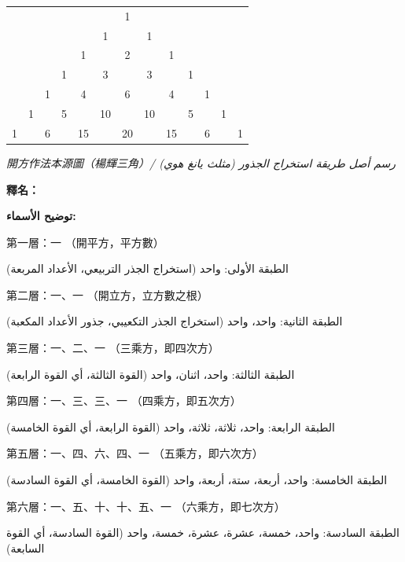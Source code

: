 \documentclass[11pt,a4paper]{article}
\newcommand{\ar}[1]{\arabicfont\beginR #1\endR}
\newcommand{\bilingualrow}[2]{%
\noindent\begin{minipage}[t]{0.48\textwidth}#1\end{minipage}\hfill\begin{minipage}[t]{0.48\textwidth}\arabicfont\beginR #2\endR\end{minipage}\par\vspace{0.5cm}}
\begin{document}
\vspace{1.5em}

\begin{center}
{\color{chartcolor}
\begin{tabular}{*{13}{c}}
& & & & & & 1 & & & & & & \\[0.8em]
& & & & & 1 & & 1 & & & & & \\[0.8em]
& & & & 1 & & 2 & & 1 & & & & \\[0.8em]
& & & 1 & & 3 & & 3 & & 1 & & & \\[0.8em]
& & 1 & & 4 & & 6 & & 4 & & 1 & & \\[0.8em]
& 1 & & 5 & & 10 & & 10 & & 5 & & 1 & \\[0.8em]
1 & & 6 & & 15 & & 20 & & 15 & & 6 & & 1 \\
\end{tabular}
}
\end{center}

\vspace{0.5em}

\begin{center}
\textit{開方作法本源圖（楊輝三角）/ \ar{رسم أصل طريقة استخراج الجذور (مثلث يانغ هوي)}}
\end{center}

\vspace{1.5em}

\bilingualrow{
\textbf{釋名：}
}{
\textbf{توضيح الأسماء:}
}

\vspace{0.3em}

\bilingualrow{
第一層：一 \quad（開平方，平方數）
}{
الطبقة الأولى: واحد \quad (استخراج الجذر التربيعي، الأعداد المربعة)
}

\bilingualrow{
第二層：一、一 \quad（開立方，立方數之根）
}{
الطبقة الثانية: واحد، واحد \quad (استخراج الجذر التكعيبي، جذور الأعداد المكعبة)
}

\bilingualrow{
第三層：一、二、一 \quad（三乘方，即四次方）
}{
الطبقة الثالثة: واحد، اثنان، واحد \quad (القوة الثالثة، أي القوة الرابعة)
}

\bilingualrow{
第四層：一、三、三、一 \quad（四乘方，即五次方）
}{
الطبقة الرابعة: واحد، ثلاثة، ثلاثة، واحد \quad (القوة الرابعة، أي القوة الخامسة)
}

\bilingualrow{
第五層：一、四、六、四、一 \quad（五乘方，即六次方）
}{
الطبقة الخامسة: واحد، أربعة، ستة، أربعة، واحد \quad (القوة الخامسة، أي القوة السادسة)
}

\bilingualrow{
第六層：一、五、十、十、五、一 \quad（六乘方，即七次方）
}{
الطبقة السادسة: واحد، خمسة، عشرة، عشرة، خمسة، واحد \quad (القوة السادسة، أي القوة السابعة)
}
\end{document}

